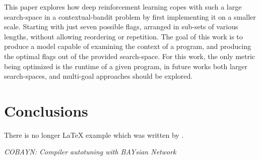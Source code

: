 \documentclass{article}
\begin{document}
This paper explores how deep reinforcement learning copes with such a large search-space in a contextual-bandit problem by first implementing it on a smaller scale. Starting with just seven possible flags, arranged in sub-sets of various lengths, without allowing reordering or repetition. The goal of this work is to produce a model capable of examining the context of a program, and producing the optimal flags out of the provided search-space. For this work, the only metric being optimized is the runtime of a given program, in future works both larger search-spaces, and multi-goal approaches should be explored.


\section{Conclusions}\label{conclusions}
There is no longer \LaTeX{} example which was written by \cite{ashouri}.


\begin{thebibliography}{9}
 \emph{COBAYN: Compiler autotuning with BAYsian Network}
\end{thebibliography}
\end{document}
